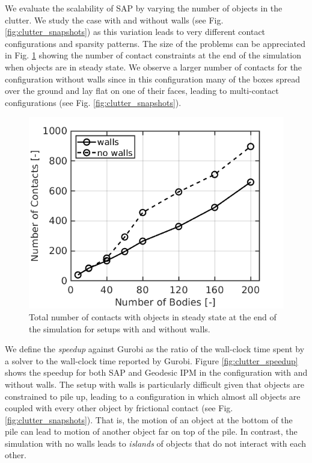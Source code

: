 We evaluate the scalability of SAP by varying the number of objects in the
clutter. We study the case with and without walls (see Fig.
\ref{fig:clutter_snapshots}) as this variation leads to very different contact
configurations and sparsity patterns. The size of the problems can be
appreciated in Fig. \ref{fig:clutter_num_contats} showing the number of contact
constraints at the end of the simulation when objects are in steady state. We
observe a larger number of contacts for the configuration without walls since in
this configuration many of the boxes spread over the ground and lay flat on one
of their faces, leading to multi-contact configurations (see Fig.
\ref{fig:clutter_snapshots}).
\begin{figure}[!h]
	\centering
	\includegraphics[width=0.7\columnwidth]{figures/clutter/number_of_contacts.png}
	\caption{\label{fig:clutter_num_contats} 
	Total number of contacts with objects in steady state at the end of the
	simulation for setups with and without walls.}
\end{figure}

We define the \emph{speedup} against Gurobi as the ratio of the wall-clock time
spent by a solver to the wall-clock time reported by Gurobi. Figure
\ref{fig:clutter_speedup} shows the speedup for both SAP and Geodesic IPM in the
configuration with and without walls. The setup with walls is particularly
difficult given that objects are constrained to pile up, leading to a
configuration in which almost all objects are coupled with every other object by
frictional contact (see Fig. \ref{fig:clutter_snapshots}). That is, the motion
of an object at the bottom of the pile can lead to motion of another object far
on top of the pile. In contrast, the simulation with no walls leads to
\emph{islands} of objects that do not interact with each other.

